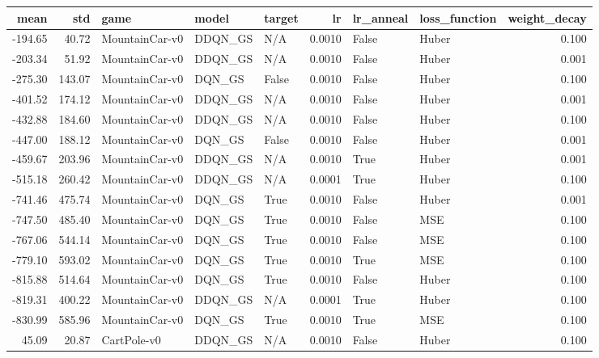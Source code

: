 \begin{tabular}{rrlllrllr}
\toprule
   mean &     std &            game &    model & target &      lr &  lr\_anneal & loss\_function &  weight\_decay \\
\midrule
-194.65 &   40.72 &  MountainCar-v0 &  DDQN\_GS &    N/A &  0.0010 &      False &         Huber &         0.100 \\
-203.34 &   51.92 &  MountainCar-v0 &  DDQN\_GS &    N/A &  0.0010 &      False &         Huber &         0.001 \\
-275.30 &  143.07 &  MountainCar-v0 &   DQN\_GS &  False &  0.0010 &      False &         Huber &         0.100 \\
-401.52 &  174.12 &  MountainCar-v0 &  DDQN\_GS &    N/A &  0.0010 &      False &         Huber &         0.001 \\
-432.88 &  184.60 &  MountainCar-v0 &  DDQN\_GS &    N/A &  0.0010 &      False &         Huber &         0.100 \\
-447.00 &  188.12 &  MountainCar-v0 &   DQN\_GS &  False &  0.0010 &      False &         Huber &         0.001 \\
-459.67 &  203.96 &  MountainCar-v0 &  DDQN\_GS &    N/A &  0.0010 &       True &         Huber &         0.001 \\
-515.18 &  260.42 &  MountainCar-v0 &  DDQN\_GS &    N/A &  0.0001 &       True &         Huber &         0.100 \\
-741.46 &  475.74 &  MountainCar-v0 &   DQN\_GS &   True &  0.0010 &      False &         Huber &         0.001 \\
-747.50 &  485.40 &  MountainCar-v0 &   DQN\_GS &   True &  0.0010 &      False &           MSE &         0.100 \\
-767.06 &  544.14 &  MountainCar-v0 &   DQN\_GS &   True &  0.0010 &      False &           MSE &         0.100 \\
-779.10 &  593.02 &  MountainCar-v0 &   DQN\_GS &   True &  0.0010 &       True &           MSE &         0.100 \\
-815.88 &  514.64 &  MountainCar-v0 &   DQN\_GS &   True &  0.0010 &      False &         Huber &         0.100 \\
-819.31 &  400.22 &  MountainCar-v0 &  DDQN\_GS &    N/A &  0.0001 &       True &         Huber &         0.100 \\
-830.99 &  585.96 &  MountainCar-v0 &   DQN\_GS &   True &  0.0010 &       True &           MSE &         0.100 \\
  45.09 &   20.87 &     CartPole-v0 &  DDQN\_GS &    N/A &  0.0010 &      False &         Huber &         0.100 \\

\end{tabular}
